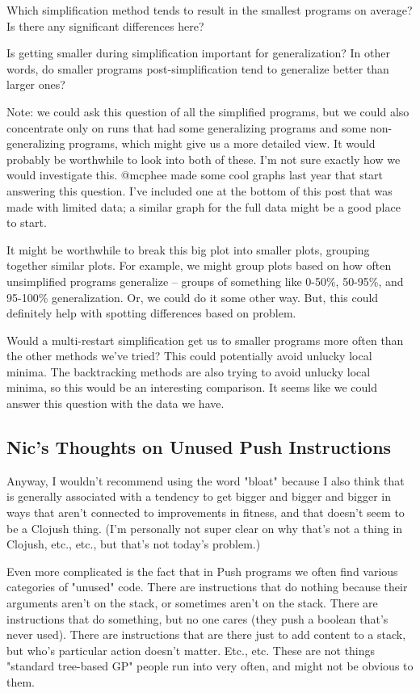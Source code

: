     Which simplification method tends to result in the smallest programs on average? Is there any significant differences here?

    Is getting smaller during simplification important for generalization? In other words, do smaller programs post-simplification tend to generalize better than larger ones?

        Note: we could ask this question of all the simplified programs, but we could also concentrate only on runs that had some generalizing programs and some non-generalizing programs, which might give us a more detailed view. It would probably be worthwhile to look into both of these. I'm not sure exactly how we would investigate this. @mcphee made some cool graphs last year that start answering this question. I've included one at the bottom of this post that was made with limited data; a similar graph for the full data might be a good place to start.

    It might be worthwhile to break this big plot into smaller plots, grouping together similar plots. For example, we might group plots based on how often unsimplified programs generalize -- groups of something like 0-50\%, 50-95\%, and 95-100\% generalization. Or, we could do it some other way. But, this could definitely help with spotting differences based on problem.

    Would a multi-restart simplification get us to smaller programs more often than the other methods we've tried? This could potentially avoid unlucky local minima. The backtracking methods are also trying to avoid unlucky local minima, so this would be an interesting comparison. It seems like we could answer this question with the data we have.

\subsection{Nic's Thoughts on Unused Push Instructions}
Anyway, I wouldn't recommend using the word "bloat" because I also think that is generally associated with a tendency to get bigger and bigger and bigger in ways that aren't connected to improvements in fitness, and that doesn't seem to be a Clojush thing. (I'm personally not super clear on why that's not a thing in Clojush, etc., etc., but that's not today's problem.)

Even more complicated is the fact that in Push programs we often find various categories of "unused" code. There are instructions that do nothing because their arguments aren't on the stack, or sometimes aren't on the stack. There are instructions that do something, but no one cares (they push a boolean that's never used). There are instructions that are there just to add content to a stack, but who's particular action doesn't matter. Etc., etc. These are not things "standard tree-based GP" people run into very often, and might not be obvious to them.

